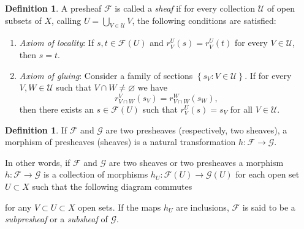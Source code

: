 \documentclass[12pt,a4paper]{book}
\theoremstyle{definition} \newtheorem{defn}[thm]{Definition}
\theoremstyle{definition} \newtheorem{ejemplo}[thm]{Example}
\theoremstyle{definition} \newtheorem{ejercicio}[thm]{Exercise}
\theoremstyle{remark} \newtheorem*{obs}{Remark}
\def\FF{\mathscr{F}}
\begin{document}
    \begin{defn}
      A presheaf $\FF$ is called a \emph{sheaf} if for every collection $\mathcal{U}$ of open subsets of $X$, calling $U=\bigcup_{V\in \mathcal{U}} V$, the following conditions are satisfied:
      \begin{enumerate}
	\item \emph{Axiom of locality}: If $s,t \in \FF(U)$ and $r^U_{V}(s)=r^U_{V}(t)$ for every $V\in \mathcal{U}$, then $s=t$.
	\item \emph{Axiom of gluing}: Consider a family of sections $\left\{ s_V: V\in \mathcal{U} \right\}$. If for every $V,W \in \mathcal{U}$ such that $V\cap W \neq \varnothing$ we have
	  \begin{equation*}
	    r^{V}_{V\cap W}(s_V)=r^{W}_{V\cap W}(s_W),
	  \end{equation*}
	  then there exists an $s\in \FF(U)$ such that $r^U_V(s)=s_V$ for all $V\in \mathcal{U}$.
      \end{enumerate}
    \end{defn}

    \begin{defn}
      If $\FF$ and $\mathscr{G}$ are two presheaves (respectively, two sheaves), a morphism of presheaves (sheaves) is a natural transformation $h:\FF\rightarrow \mathscr{G}$. 
    \end{defn}
    In other words, if $\FF$ and $\mathscr{G}$ are two sheaves or two presheaves a morphism $h:\FF \rightarrow \mathscr{G}$ is a collection of morphisms $h_U:\FF(U) \rightarrow \mathscr{G}(U)$ for each open set $U\subset X$ such that the following diagram commutes
    \begin{center}
     \end{center}
     for any $V\subset U \subset X$ open sets. If the maps $h_U$ are inclusions, $\FF$ is said to be a \emph{subpresheaf} or a \emph{subsheaf} of $\mathscr{G}$.
\end{document}
